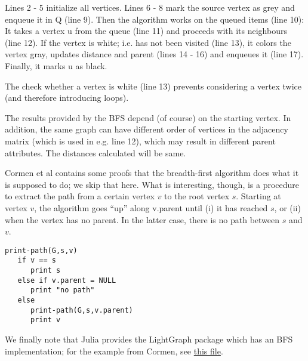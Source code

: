 Lines 2 - 5 initialize all vertices. Lines 6 - 8 mark the source vertex as grey and enqueue it in Q (line 9). Then the algorithm works on the queued items (line 10): It takes a vertex u from the queue (line 11) and proceeds with its neighbours (line 12). If the vertex is white; i.e. has not been visited (line 13), it colors the vertex gray, updates distance and parent (lines 14 - 16) and enqueues it (line 17). Finally, it marks u as black.

The check whether a vertex is white (line 13) prevents considering a vertex twice (and therefore introducing loops).

The results provided by the BFS depend (of course) on the starting vertex. In addition, the same graph can have different order of vertices in the adjacency matrix (which is used in e.g. line 12), which may result in different parent attributes. The distances calculated will be same.

Cormen et al contains some proofs that the breadth-first algorithm does what it is supposed to do; we skip that here. What is interesting, though, is a procedure to extract the path from a certain vertex $v$ to the root vertex $s$. Starting at vertex $v$, the algorithm goes ``up'' along v.parent until (i) it has reached $s$, or (ii) when the vertex has no parent. In the latter case, there is no path between $s$ and $v$.

\begin{verbatim}
print-path(G,s,v)
   if v == s
      print s
   else if v.parent = NULL
      print "no path"
   else
      print-path(G,s,v.parent)
      print v
\end{verbatim}

We finally note that Julia provides the LightGraph package which has an BFS implementation; for the example from Cormen, see \href{https://github.com/ClemensFMN/JuliaStuff/blob/master/Graphs/bfs_traversal.jl}{this file}.


